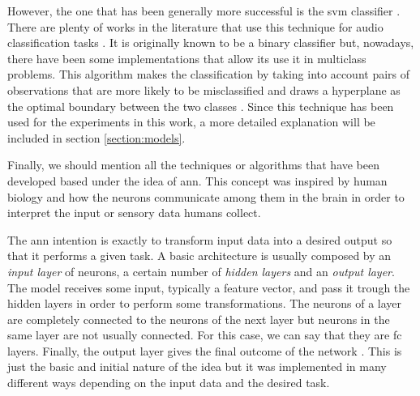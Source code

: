 	However, the one that has been generally more successful is the \acrfull{svm} classifier . There are plenty of works in the literature that use this technique for audio classification tasks \cite{Jiang2005} \cite{Geiger2013} \cite{Barchiesi2015}. It is originally known to be a binary classifier but, nowadays, there have been some implementations that allow its use it in multiclass problems. This algorithm makes the classification by taking into account pairs of observations that are more likely to be misclassified and draws a hyperplane as the optimal boundary between the two classes \cite{Fu2011}. Since this technique has been used for the experiments in this work, a more detailed explanation will be included in section \ref{section:models}.
	
	Finally, we should mention all the techniques or algorithms that have been developed based under the idea of \acrfull{ann}. This concept was inspired by human biology and how the neurons communicate among them in the brain in order to interpret the input or sensory data humans collect. 
	
	
	The \acrshort{ann} intention is exactly to transform input data into a desired output so that it performs a given task. %
	A basic architecture is usually composed by an \textit{input layer} of neurons, a certain number of \textit{hidden layers} and an \textit{output layer}. The model receives some input, typically a feature vector, and pass it trough the hidden layers in order to perform some transformations. The neurons of a layer are completely connected to the neurons of the next layer but neurons in the same layer are not usually connected. For this case, we can say that they are \acrfull{fc} layers. Finally, the output layer gives the final outcome of the network \cite{Kwon2011}. This is just the basic and initial nature of the idea but it was implemented in many different ways depending on the input data and the desired task.
	
	
	
	
	
	
	

	
	
	
	

	
	
	
	
	
	
	
	